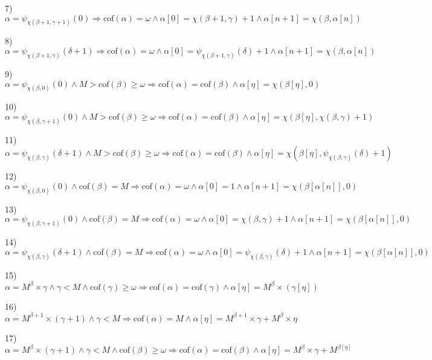 \documentclass[10pt]{article}
\begin{document}
7) \(\alpha=\psi _{\chi(\beta+1,\gamma+1)}(0) \Rightarrow \text{cof}(\alpha)=\omega \wedge \alpha[0]=\chi(\beta+1,\gamma)+1 \wedge \alpha[n+1]=\chi(\beta,\alpha[n])\)

8) \(\alpha=\psi_{\chi(\beta+1,\gamma)}(\delta+1) \Rightarrow \text{cof}(\alpha)=\omega \wedge \alpha[0]= \psi_{\chi(\beta+1,\gamma)}(\delta)+1 \wedge \alpha[n+1]=\chi(\beta,\alpha[n])\)

\bigskip

9) \(\alpha=\psi _{\chi(\beta,0)}(0) \wedge M>\text{cof}(\beta)\geq\omega \Rightarrow \text{cof} (\alpha)= \text{cof} (\beta) \wedge \alpha[\eta]=\chi(\beta[\eta],0)\)

10) \(\alpha=\psi_{ \chi(\beta,\gamma+1)}(0) \wedge M>\text{cof}(\beta)\geq\omega \Rightarrow \text{cof}(\alpha)=\text{cof}(\beta)\wedge \alpha[\eta]=\chi(\beta[\eta],\chi(\beta,\gamma)+1)\)

11) \(\alpha=\psi_{ \chi(\beta,\gamma)}(\delta+1) \wedge M>\text{cof} (\beta)\geq\omega \Rightarrow \text{cof}(\alpha)=\text{cof}(\beta) \wedge \alpha[\eta]=\chi(\beta[\eta],\psi_{\chi(\beta,\gamma)}(\delta)+1)\)

\bigskip

12) \(\alpha=\psi_{\chi(\beta,0)}(0) \wedge \text{cof}(\beta)=M\Rightarrow \text{cof}(\alpha)= \omega \wedge \alpha[0]=1 \wedge \alpha[n+1]=\chi(\beta[\alpha[n]],0)\)

13) \(\alpha=\psi_{ \chi(\beta,\gamma+1)}(0) \wedge \text{cof} (\beta)=M \Rightarrow \text{cof} (\alpha)= \omega \wedge \alpha[0]=\chi(\beta,\gamma)+1 \wedge \alpha[n+1]=\chi(\beta[\alpha[n]],0)\)

14) \(\alpha=\psi_{\chi(\beta,\gamma)}(\delta+1) \wedge \text{cof} (\beta)=M \Rightarrow \text{cof} (\alpha)= \omega \wedge \alpha[0]= \psi_{ \chi(\beta,\gamma)}(\delta)+1 \wedge \alpha[n+1]=\chi(\beta[\alpha[n]],0)\)

\bigskip

15) \(\alpha=M^{\beta}\times\gamma \wedge \gamma<M \wedge \text{cof} (\gamma)\geq\omega \Rightarrow \text{cof} (\alpha)= \text{cof}(\gamma)\wedge\alpha[\eta]=M^{\beta}\times(\gamma[\eta])\)

16) \(\alpha=M^{\beta+1}\times(\gamma+1) \wedge \gamma<M \Rightarrow \text{cof} (\alpha)=M \wedge\alpha[\eta]=M^{\beta+1}\times\gamma+M^\beta\times\eta\)

17) \(\alpha=M^\beta\times(\gamma+1) \wedge \gamma<M \wedge\text{cof}(\beta)\geq\omega \Rightarrow \text{cof}(\alpha)= \text{cof}(\beta) \wedge \alpha[\eta]=M^\beta\times\gamma+M^{\beta[\eta]}\)
\end{document}
